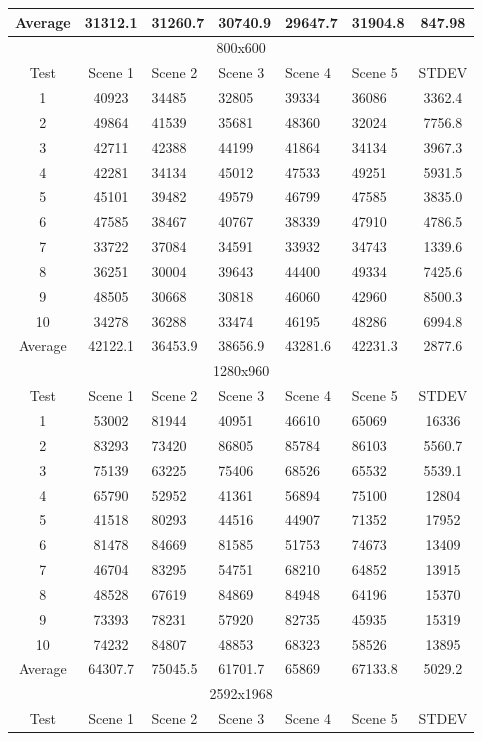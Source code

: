 \begin{table}[H]
\begin{tabular}{| c | c | l | l | l | l | c | }
Average	&31312.1	&31260.7	&30740.9	&29647.7	&31904.8	&847.98\\
\hline
 \hline 
\multicolumn{7}{|c|}{800x600}\\
\hline
Test	&Scene 1	&Scene 2	&Scene 3	&Scene 4	&Scene 5	&STDEV\\\hline
1	&40923	&34485	&32805	&39334	&36086	&3362.4\\
2	&49864	&41539	&35681	&48360	&32024	&7756.8\\
3	&42711	&42388	&44199	&41864	&34134	&3967.3\\
4	&42281	&34134	&45012	&47533	&49251	&5931.5\\
5	&45101	&39482	&49579	&46799	&47585	&3835.0\\
6	&47585	&38467	&40767	&38339	&47910	&4786.5\\
7	&33722	&37084	&34591	&33932	&34743	&1339.6\\
8	&36251	&30004	&39643	&44400	&49334	&7425.6\\
9	&48505	&30668	&30818	&46060	&42960	&8500.3\\
10	&34278	&36288	&33474	&46195	&48286	&6994.8\\\hline
Average	&42122.1	&36453.9	&38656.9	&43281.6	&42231.3	&2877.6\\
\hline
 \hline 
\multicolumn{7}{|c|}{1280x960}\\
\hline
Test	&Scene 1	&Scene 2	&Scene 3	&Scene 4	&Scene 5	&STDEV\\\hline
1	&53002	&81944	&40951	&46610	&65069	&16336\\
2	&83293	&73420	&86805	&85784	&86103	&5560.7\\
3	&75139	&63225	&75406	&68526	&65532	&5539.1\\
4	&65790	&52952	&41361	&56894	&75100	&12804\\
5	&41518	&80293	&44516	&44907	&71352	&17952\\
6	&81478	&84669	&81585	&51753	&74673	&13409\\
7	&46704	&83295	&54751	&68210	&64852	&13915\\
8	&48528	&67619	&84869	&84948	&64196	&15370\\
9	&73393	&78231	&57920	&82735	&45935	&15319\\
10	&74232	&84807	&48853	&68323	&58526	&13895\\\hline
Average	&64307.7	&75045.5	&61701.7	&65869	&67133.8	&5029.2\\
\hline
 \hline 
\multicolumn{7}{|c|}{2592x1968}\\
\hline
Test	&Scene 1	&Scene 2	&Scene 3	&Scene 4	&Scene 5	&STDEV\\\hline

\end{tabular}
\end{table}
